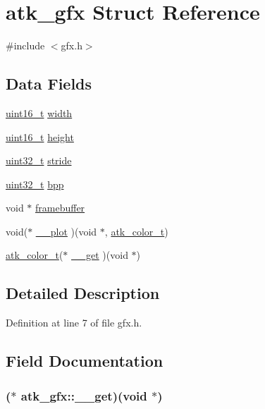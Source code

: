 \hypertarget{structatk__gfx}{\section{atk\+\_\+gfx Struct Reference}
\label{structatk__gfx}
}


{\ttfamily \#include $<$gfx.\+h$>$}

\subsection*{Data Fields}
\begin{DoxyCompactItemize}
\item 
\hyperlink{aplus_8h_a5a8b2dc9e45a9ee81a94ef304fb62505}{uint16\+\_\+t} \hyperlink{structatk__gfx_a8c8d73df98a82572a666824b52b99964}{width}
\item 
\hyperlink{aplus_8h_a5a8b2dc9e45a9ee81a94ef304fb62505}{uint16\+\_\+t} \hyperlink{structatk__gfx_a5dcdddc358345ad49f4015253f1acbe6}{height}
\item 
\hyperlink{aplus_8h_a53a0df51603c77c2aa5b9ea61b606a82}{uint32\+\_\+t} \hyperlink{structatk__gfx_a7f050db1e3d134473b2077ab5275b727}{stride}
\item 
\hyperlink{aplus_8h_a53a0df51603c77c2aa5b9ea61b606a82}{uint32\+\_\+t} \hyperlink{structatk__gfx_a27d24c7a918386527067975cfd8da971}{bpp}
\item 
void $\ast$ \hyperlink{structatk__gfx_a00413765e42e1a347e45401e1a2e95bf}{framebuffer}
\item 
void($\ast$ \hyperlink{structatk__gfx_ad0600b98849b356fa7d12a3e4237588b}{\+\_\+\+\_\+plot} )(void $\ast$, \hyperlink{atk_8h_a85e5d8dafaa1bf57b05a1cd0dd9d3b82}{atk\+\_\+color\+\_\+t})
\item 
\hyperlink{atk_8h_a85e5d8dafaa1bf57b05a1cd0dd9d3b82}{atk\+\_\+color\+\_\+t}($\ast$ \hyperlink{structatk__gfx_ae36225bc515975b602bde086de71ad24}{\+\_\+\+\_\+get} )(void $\ast$)
\end{DoxyCompactItemize}


\subsection{Detailed Description}


Definition at line 7 of file gfx.\+h.



\subsection{Field Documentation}
\hypertarget{structatk__gfx_ae36225bc515975b602bde086de71ad24}{
\subsubsection[{\+\_\+\+\_\+get}]{($\ast$ atk\+\_\+gfx\+::\+\_\+\+\_\+get)(void $\ast$)}}\label{structatk__gfx_ae36225bc515975b602bde086de71ad24}


